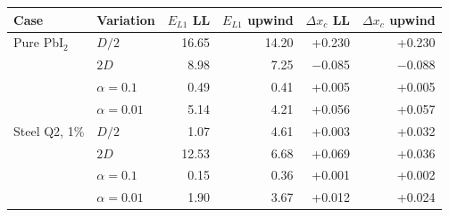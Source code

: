 \begin{tabular}{llrrrr}
\toprule
Case & Variation & $E_{L1}$ LL & $E_{L1}$ upwind & $\Delta x_c$ LL & $\Delta x_c$ upwind \\
\midrule
Pure PbI$_2$ & $D/2$ & 16.65 & 14.20 & +0.230 & +0.230 \\
 & $2D$ & 8.98 & 7.25 & $-$0.085 & $-$0.088 \\
 & $\alpha=0.1$ & 0.49 & 0.41 & +0.005 & +0.005 \\
 & $\alpha=0.01$ & 5.14 & 4.21 & +0.056 & +0.057 \\
\midrule
Steel Q2, 1\% & $D/2$ & 1.07 & 4.61 & +0.003 & +0.032 \\
 & $2D$ & 12.53 & 6.68 & +0.069 & +0.036 \\
 & $\alpha=0.1$ & 0.15 & 0.36 & +0.001 & +0.002 \\
 & $\alpha=0.01$ & 1.90 & 3.67 & +0.012 & +0.024 \\
\bottomrule
\end{tabular}
